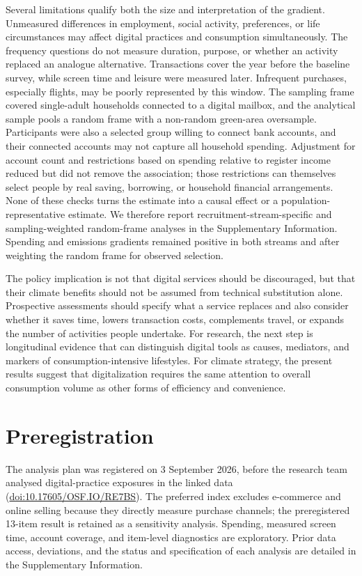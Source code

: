 \documentclass[11pt,a4paper]{article}
\begin{document}
Several limitations qualify both the size and interpretation of the gradient.
Unmeasured differences in employment, social activity, preferences, or life
circumstances may affect digital practices and consumption simultaneously. The
frequency questions do not measure duration, purpose, or whether an activity
replaced an analogue alternative. Transactions cover the year before the
baseline survey, while screen time and leisure were measured later. Infrequent
purchases, especially flights, may be poorly represented by this window. The
sampling frame covered single-adult households connected to a digital mailbox,
and the analytical sample pools a random frame with a non-random green-area
oversample. Participants were also a selected group willing to connect bank
accounts, and their connected
accounts may not capture all household spending. Adjustment for account count
and restrictions based on spending relative to register income reduced but did
not remove the association; those restrictions can themselves select people by
real saving, borrowing, or household financial arrangements. None of these
checks turns the estimate into a causal effect or a population-representative
estimate. We therefore report recruitment-stream-specific and sampling-weighted
random-frame analyses in the Supplementary Information. Spending and emissions
gradients remained positive in both streams and after weighting the random
frame for observed selection.

The policy implication is not that digital services should be discouraged, but
that their climate benefits should not be assumed from technical substitution
alone. Prospective assessments should specify what a service replaces and also
consider whether it saves time, lowers transaction costs, complements travel,
or expands the number of activities people undertake. For research, the next
step is longitudinal evidence that can distinguish digital tools as causes,
mediators, and markers of consumption-intensive lifestyles. For climate
strategy, the present results suggest that digitalization requires the same
attention to overall consumption volume as other forms of efficiency and
convenience.

\section*{Preregistration}
The analysis plan was registered on 3 September 2026, before the research team
analysed digital-practice exposures in the linked data
(\href{https://doi.org/10.17605/OSF.IO/RE7BS}{doi:10.17605/OSF.IO/RE7BS}). The
preferred index excludes e-commerce and online selling because they directly
measure purchase channels; the preregistered 13-item result is retained as a
sensitivity analysis. Spending, measured screen time, account coverage, and
item-level diagnostics are exploratory. Prior data access, deviations, and the
status and specification of each analysis are detailed in the Supplementary
Information.



\end{document}
